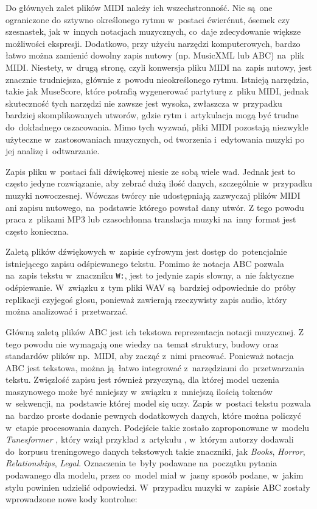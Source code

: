 \documentclass[data-science]{agh-wi} %
\begin{document}
Do głównych zalet plików MIDI należy ich wszechstronność. Nie są~one ograniczone do sztywno określonego rytmu w~postaci ćwierćnut, ósemek czy szesnastek, jak w~innych notacjach muzycznych, co~daje zdecydowanie większe możliwości ekspresji. Dodatkowo, przy użyciu narzędzi komputerowych, bardzo łatwo można zamienić dowolny zapis nutowy (np. MusicXML lub ABC) na~plik MIDI. Niestety, w~drugą stronę, czyli konwersja pliku MIDI na~zapis nutowy, jest znacznie trudniejsza, głównie z~powodu nieokreślonego rytmu. Istnieją narzędzia, takie jak MuseScore, które potrafią wygenerować partyturę z~pliku MIDI, jednak skuteczność tych narzędzi nie zawsze jest wysoka, zwłaszcza w~przypadku bardziej skomplikowanych utworów, gdzie rytm i~artykulacja mogą być trudne do~dokładnego oszacowania. Mimo tych wyzwań, pliki MIDI pozostają niezwykle użyteczne w~zastosowaniach muzycznych, od tworzenia i~edytowania muzyki po jej analizę i~odtwarzanie.

Zapis pliku w~postaci fali dźwiękowej niesie ze sobą wiele wad. Jednak jest to często jedyne rozwiązanie, aby zebrać dużą ilość danych, szczególnie w~przypadku muzyki nowoczesnej. Wówczas twórcy nie udostępniają zazwyczaj plików MIDI ani zapisu nutowego, na~podstawie którego powstał dany utwór. Z tego powodu praca z~plikami MP3 lub czasochłonna translacja muzyki na~inny format jest często konieczna.

Zaletą plików dźwiękowych w~zapisie cyfrowym jest dostęp do~potencjalnie istniejącego zapisu odśpiewanego tekstu. Pomimo że notacja ABC pozwala na~zapis tekstu w~znaczniku \texttt{W:}, jest to jedynie zapis słowny, a~nie faktyczne odśpiewanie. W~związku z~tym pliki WAV są~bardziej odpowiednie do~próby replikacji czyjegoś głosu, ponieważ zawierają rzeczywisty zapis audio, który można analizować i~przetwarzać.

Główną zaletą plików ABC jest ich tekstowa reprezentacja notacji muzycznej. Z tego powodu nie wymagają one wiedzy na~temat struktury, budowy oraz standardów plików np.~MIDI, aby zacząć z~nimi pracować. Ponieważ notacja ABC jest tekstowa, można ją~łatwo integrować z~narzędziami do~przetwarzania tekstu. Zwięzłość zapisu jest również przyczyną, dla której model uczenia maszynowego może być mniejszy w~związku z~mniejszą ilością tokenów w~sekwencji, na~podstawie której model się uczy. Zapis w~postaci tekstu pozwala na~bardzo proste dodanie pewnych dodatkowych danych, które można policzyć w~etapie procesowania danych. Podejście takie zostało zaproponowane w~modelu \textit{Tunesformer} \cite{tunesformer}, który wziął przykład z~artykułu \cite{keskarCTRL2019}, w~którym autorzy dodawali do~korpusu treningowego danych tekstowych takie znaczniki, jak \textit{Books}, \textit{Horror}, \textit{Relationships}, \textit{Legal}. Oznaczenia te~były podawane na~początku pytania podawanego dla modelu, przez co~model miał w~jasny sposób podane, w~jakim stylu powinien udzielić odpowiedzi. W~przypadku muzyki w~zapisie ABC zostały wprowadzone nowe kody kontrolne:
\end{document}
